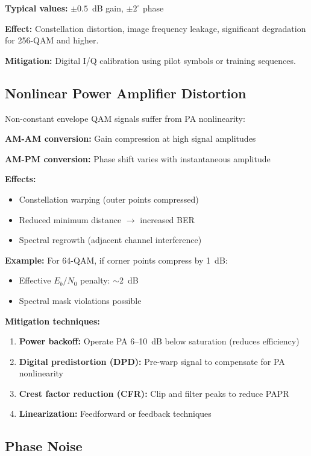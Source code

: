 \textbf{Typical values:} $\pm 0.5$~dB gain, $\pm 2^\circ$ phase

\textbf{Effect:} Constellation distortion, image frequency leakage, significant degradation for 256-QAM and higher.

\textbf{Mitigation:} Digital I/Q calibration using pilot symbols or training sequences.

\subsection{Nonlinear Power Amplifier Distortion}

Non-constant envelope QAM signals suffer from PA nonlinearity:

\textbf{AM-AM conversion:} Gain compression at high signal amplitudes

\textbf{AM-PM conversion:} Phase shift varies with instantaneous amplitude

\textbf{Effects:}
\begin{itemize}
\item Constellation warping (outer points compressed)
\item Reduced minimum distance $\rightarrow$ increased BER
\item Spectral regrowth (adjacent channel interference)
\end{itemize}

\textbf{Example:} For 64-QAM, if corner points compress by 1~dB:
\begin{itemize}
\item Effective $E_b/N_0$ penalty: $\sim$2~dB
\item Spectral mask violations possible
\end{itemize}

\textbf{Mitigation techniques:}
\begin{enumerate}
\item \textbf{Power backoff:} Operate PA 6--10~dB below saturation (reduces efficiency)
\item \textbf{Digital predistortion (DPD):} Pre-warp signal to compensate for PA nonlinearity
\item \textbf{Crest factor reduction (CFR):} Clip and filter peaks to reduce PAPR
\item \textbf{Linearization:} Feedforward or feedback techniques
\end{enumerate}

\subsection{Phase Noise}

